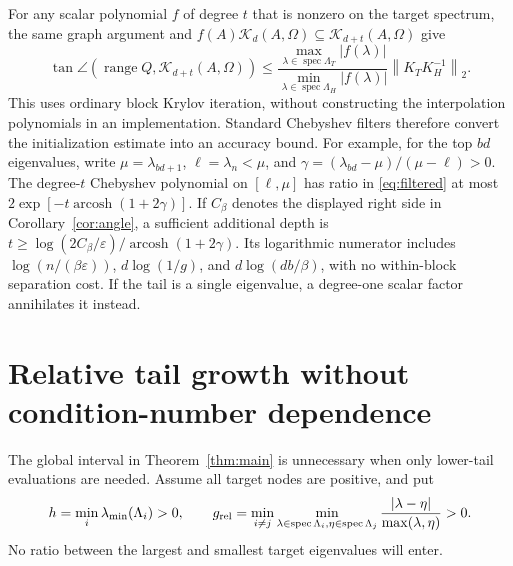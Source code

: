 \documentclass[11pt]{article}
\newcommand{\norm}[1]{\left\lVert#1\right\rVert}
\newcommand{\K}{\mathcal K}
\newcommand{\range}{\operatorname{range}}
\begin{document}
For any scalar polynomial $f$ of degree $t$ that is nonzero on the
target spectrum, the same graph argument and
$f(A)\K_d(A,\Omega)\subseteq\K_{d+t}(A,\Omega)$ give
\begin{equation}\label{eq:filtered}
 \tan\angle(\range Q,\K_{d+t}(A,\Omega))
 \leq\frac{\max_{\lambda\in\operatorname{spec}\Lambda_T}|f(\lambda)|}
              {\min_{\lambda\in\operatorname{spec}\Lambda_H}|f(\lambda)|}
             \norm{K_TK_H^{-1}}_2.
\end{equation}
This uses ordinary block Krylov iteration, without constructing the
interpolation polynomials in an implementation. Standard Chebyshev filters
therefore convert the initialization estimate into an accuracy bound.
For example, for the top $bd$ eigenvalues, write $\mu=\lambda_{bd+1}$,
$\ell=\lambda_n<\mu$, and
$\gamma=(\lambda_{bd}-\mu)/(\mu-\ell)>0$. The degree-$t$ Chebyshev
polynomial on $[\ell,\mu]$ has ratio in \eqref{eq:filtered} at most
$2\exp[-t\operatorname{arcosh}(1+2\gamma)]$.
If $C_\beta$ denotes the displayed right side in
Corollary~\ref{cor:angle}, a sufficient additional depth is
$t\geq\log(2C_\beta/\varepsilon)/\operatorname{arcosh}(1+2\gamma)$.
Its logarithmic numerator includes $\log(n/(\beta\varepsilon))$,
$d\log(1/g)$, and $d\log(db/\beta)$, with no within-block separation
cost. If the tail is a single eigenvalue, a
degree-one scalar factor annihilates it instead.

\section{Relative tail growth without condition-number dependence}
The global interval in Theorem~\ref{thm:main} is unnecessary when only
lower-tail evaluations are needed. Assume all target nodes are positive,
and put
\[
 h=\min_i\lambda_{\min}(\Lambda_i)>0,\qquad
 g_{\rm rel}=\min_{i\ne j}\min_{\lambda\in\operatorname{spec}\Lambda_i,
                   \eta\in\operatorname{spec}\Lambda_j}
              \frac{|\lambda-\eta|}{\max(\lambda,\eta)}>0.
\]
No ratio between the largest and smallest target eigenvalues will enter.
\end{document}

